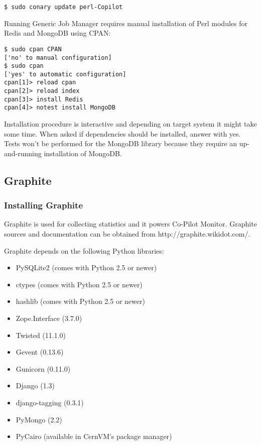 \lstset{caption=Installing \copilot dependencies on CernVM}
\begin{lstlisting}
$ sudo conary update perl-Copilot
\end{lstlisting}

Running \copilot Generic Job Manager requires manual installation of Perl modules for Redis and MongoDB using CPAN:

\lstset{caption=Installing Perl modules}
\begin{lstlisting}
$ sudo cpan CPAN
['no' to manual configuration]
$ sudo cpan
['yes' to automatic configuration]
cpan[1]> reload cpan
cpan[2]> reload index
cpan[3]> install Redis
cpan[4]> notest install MongoDB
\end{lstlisting}

Installation procedure is interactive and depending on target system it might take some time. When asked if dependencies should be installed, answer with yes. Tests won't be performed for the MongoDB library because they require an up-and-running installation of MongoDB.

\subsection{Graphite}
\subsubsection{Installing Graphite}
Graphite is used for collecting statistics and it powers Co-Pilot Monitor.
Graphite sources and documentation can be obtained from http://graphite.wikidot.com/.

Graphite depends on the following Python libraries:
\begin{itemize}
  \item PySQLite2 (comes with Python 2.5 or newer)
  \item ctypes (comes with Python 2.5 or newer)
  \item hashlib (comes with Python 2.5 or newer)
  \item Zope.Interface (3.7.0)
  \item Twisted (11.1.0)
  \item Gevent (0.13.6)
  \item Gunicorn (0.11.0)
  \item Django (1.3)
  \item django-tagging (0.3.1)
  \item PyMongo (2.2)
  \item PyCairo (available in CernVM's package manager)
\end{itemize}

